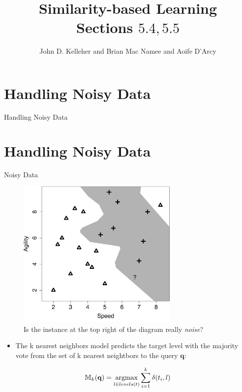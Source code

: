 \documentclass[xcolor={table}]{beamer}
\title{Similarity-based Learning\\Sections $5.4, 5.5$}
\author{John D. Kelleher and Brian Mac Namee and Aoife D'Arcy}
\institute{}
\date{}
\newcommand{\SectionSlideShortHeader}[3][]{
	\ifthenelse{\isempty{#1}}
		{\section[#3]{#2}\begin{frame} \begin{center}\begin{huge}#2\end{huge}\end{center}\end{frame}}
		{\section[#1]{#2}\begin{frame} \begin{center}\begin{huge}#3\end{huge}\end{center}\end{frame}}
}
\DeclareMathOperator*{\argmax}{argmax}
\begin{document}
\begin{frame}
	\titlepage
\end{frame}
\begin{frame}
	 \tableofcontents
\end{frame}

\SectionSlideShortHeader{Handling Noisy Data}{Noisy Data}

 \begin{frame} 
\begin{figure}[htb]
       \begin{centering}
     		\includegraphics[width=0.7\textwidth]{./images/knn_fs_4_small.pdf}
     	  \caption{Is the instance at the top right of the diagram really \textit{noise}?}
	\label{fig:voronoidecboundB}
       \end{centering}
\end{figure}
\end{frame} 

\begin{frame} 
\begin{itemize}
\item The \alert{k nearest neighbors} model predicts the target level with the majority vote from the set of k nearest neightbors to the query $\mathbf{q}$:  
\end{itemize}

\begin{equation}
\centering
\mathbb{M}_{k}(\mathbf{q}) = \argmax_{l \in levels(t)} \sum_{i=1}^k \delta(t_i,l) 
\label{eq:knn}
\end{equation}
\end{frame} 
\end{document}
